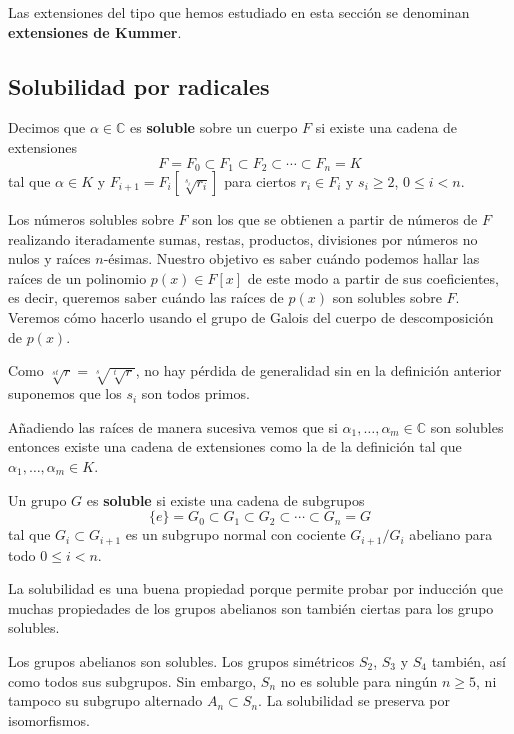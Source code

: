 Las extensiones del tipo que hemos estudiado en esta sección se
denominan \textbf{extensiones de Kummer}.

\hypertarget{solubilidad-por-radicales}{%
\subsection{Solubilidad por radicales}\label{solubilidad-por-radicales}}


Decimos que \(\alpha\in \mathbb{C}\) es \textbf{soluble} sobre un cuerpo
\(F\) si existe una cadena de extensiones
\[F = F_0\subset F_1\subset F_2\subset\cdots\subset  F_n=K\] tal que
\(\alpha\in K\) y \(F_{i+1}=F_i[\sqrt[s_i]{r_i}]\) para ciertos
\(r_i\in F_i\) y \(s_i\geq 2\), \(0\leq i<n\). 

Los números solubles sobre \(F\) son los que se obtienen a partir de
números de \(F\) realizando iteradamente sumas, restas, productos,
divisiones por números no nulos y raíces \(n\)-ésimas. Nuestro objetivo
es saber cuándo podemos hallar las raíces de un polinomio
\(p(x)\in F[x]\) de este modo a partir de sus coeficientes, es decir,
queremos saber cuándo las raíces de \(p(x)\) son solubles sobre \(F\).
Veremos cómo hacerlo usando el grupo de Galois del cuerpo de
descomposición de \(p(x)\).


Como \(\sqrt[st]{r}=\sqrt[s]{\sqrt[t]{r}}\), no hay pérdida de
generalidad sin en la definición anterior suponemos que los \(s_i\) son
todos primos.

Añadiendo las raíces de manera sucesiva vemos que si
\(\alpha_1,\dots,\alpha_m\in\mathbb{C}\) son solubles entonces existe
una cadena de extensiones como la de la definición tal que
\(\alpha_1,\dots,\alpha_m\in K\). 


Un grupo \(G\) es \textbf{soluble} si existe una cadena de subgrupos
\[\{e\}=G_0 \subset G_1 \subset G_2 \subset \cdots\subset G_n=G\]
tal que \(G_i\subset G_{i+1}\) es un subgrupo normal con cociente
\(G_{i+1}/G_i\) abeliano para todo \(0\leq i<n\). 

La solubilidad es una buena propiedad porque permite probar por
inducción que muchas propiedades de los grupos abelianos son también
ciertas para los grupo solubles.


Los grupos abelianos son solubles. Los grupos simétricos \(S_2\),
\(S_3\) y \(S_4\) también, así como todos sus subgrupos. Sin embargo,
\(S_n\) no es soluble para ningún \(n\geq 5\), ni tampoco su subgrupo
alternado \(A_n\subset S_n\). La solubilidad se preserva por
isomorfismos. 

